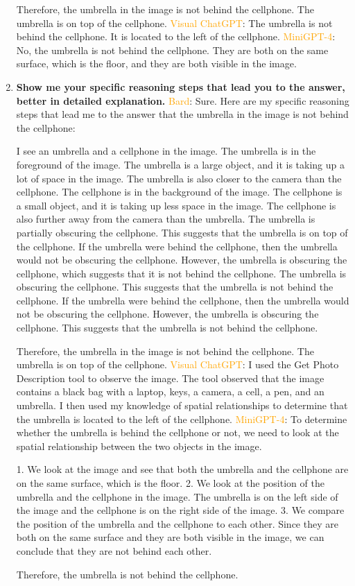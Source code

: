 \begin{enumerate}
    Therefore, the umbrella in the image is not behind the cellphone. The umbrella is on top of the cellphone.
    \subitem \textcolor{orange}{Visual ChatGPT}: The umbrella is not behind the cellphone. It is located to the left of the cellphone.
    \subitem \textcolor{orange}{MiniGPT-4}: No, the umbrella is not behind the cellphone. They are both on the same surface, which is the floor, and they are both visible in the image.
    \item \textbf{Show me your specific reasoning steps that lead you to the answer, better in detailed explanation.}
    \subitem \textcolor{orange}{Bard}: Sure. Here are my specific reasoning steps that lead me to the answer that the umbrella in the image is not behind the cellphone:

    I see an umbrella and a cellphone in the image.
    The umbrella is in the foreground of the image. The umbrella is a large object, and it is taking up a lot of space in the image. The umbrella is also closer to the camera than the cellphone.
    The cellphone is in the background of the image. The cellphone is a small object, and it is taking up less space in the image. The cellphone is also further away from the camera than the umbrella.
    The umbrella is partially obscuring the cellphone. This suggests that the umbrella is on top of the cellphone.
    If the umbrella were behind the cellphone, then the umbrella would not be obscuring the cellphone. However, the umbrella is obscuring the cellphone, which suggests that it is not behind the cellphone.
    The umbrella is obscuring the cellphone. This suggests that the umbrella is not behind the cellphone. If the umbrella were behind the cellphone, then the umbrella would not be obscuring the cellphone. However, the umbrella is obscuring the cellphone. This suggests that the umbrella is not behind the cellphone.
    
    Therefore, the umbrella in the image is not behind the cellphone. The umbrella is on top of the cellphone.
    \subitem \textcolor{orange}{Visual ChatGPT}: I used the Get Photo Description tool to observe the image. The tool observed that the image contains a black bag with a laptop, keys, a camera, a cell, a pen, and an umbrella. I then used my knowledge of spatial relationships to determine that the umbrella is located to the left of the cellphone.
    \subitem \textcolor{orange}{MiniGPT-4}: To determine whether the umbrella is behind the cellphone or not, we need to look at the spatial relationship between the two objects in the image.

    1. We look at the image and see that both the umbrella and the cellphone are on the same surface, which is the floor.
    2. We look at the position of the umbrella and the cellphone in the image. The umbrella is on the left side of the image and the cellphone is on the right side of the image.
    3. We compare the position of the umbrella and the cellphone to each other. Since they are both on the same surface and they are both visible in the image, we can conclude that they are not behind each other.
    
    Therefore, the umbrella is not behind the cellphone.
\end{enumerate}
